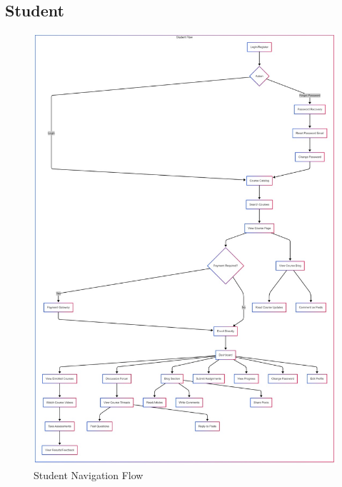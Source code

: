 \documentclass[a4paper, 11pt]{scrreprt}
\begin{document}
\subsection{Student}
\begin{figure}[!htb]
    \centering
    \includegraphics[height=0.6\textheight]{UI/stuFlow.jpg}
    \caption{Student Navigation Flow}
\end{figure}
\end{document}
